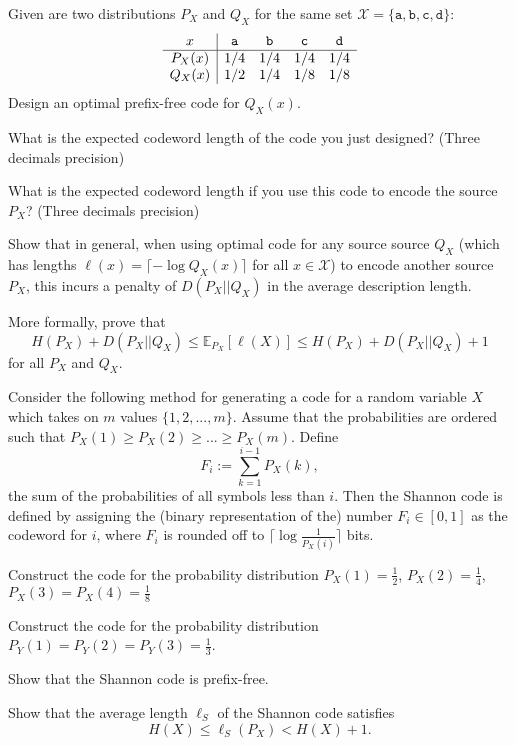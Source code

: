 \documentclass[a4paper,10pt,landscape,twocolumn]{scrartcl}
\begin{document}
\begin{exercise}
\begin{subex}[(2pt)]
Given are two distributions $P_X$ and $Q_X$ for the same set $\mathcal{X} = \{\mathtt{a,b,c,d}\}$:
\[
\begin{array}{c | c c c c}
x & \mathtt{a}&\mathtt{b}&\mathtt{c}&\mathtt{d}\\\hline
P_X(x) & 1/4&1/4&1/4&1/4\\
Q_X(x) & 1/2&1/4&1/8&1/8\\
\end{array}
\]
Design an optimal prefix-free code for $Q_X(x)$.
\end{subex}
\begin{subex}[(1pt)]
What is the expected codeword length of the code you just designed? (Three decimals precision)
\end{subex}
\begin{subex}[(1pt)]
What is the expected codeword length if you use this code to encode the source $P_X$? (Three decimals precision)
\end{subex}
\begin{subex}[(4pt)]
Show that in general, when using optimal code for any source source $Q_X$ (which has lengths $\ell(x) = \lceil -\log Q_X(x) \rceil$ for all $x \in \mathcal{X}$) to encode another source $P_X$, this incurs a penalty of $D(P_X||Q_X)$ in the average description length.

More formally, prove that
\[
H(P_X) + D(P_X||Q_X) \leq \mathbb{E}_{P_X}[\ell(X)] \leq H(P_X) + D(P_X||Q_X) + 1
\]
for all $P_X$ and $Q_X$.
\end{subex}
\end{exercise}




\begin{exercise}
Consider the following method for generating a code for a random variable $X$ which takes on $m$ values $\{1,2,...,m\}$. Assume that the probabilities are ordered such that $P_X(1) \geq P_X(2) \geq ... \geq P_X(m)$. Define
\[
F_i := \sum_{k=1}^{i-1} P_X(k),
\]
the sum of the probabilities of all symbols less than $i$. Then the Shannon code is defined by assigning the (binary representation of the) number $F_i \in [0,1]$ as the codeword for $i$, where $F_i$ is rounded off to $\lceil \log\frac{1}{P_X(i)}\rceil$ bits.
	\begin{subex}[(1pt)]
	Construct the code for the probability distribution $P_X(1) = \frac{1}{2}$, $P_X(2) = \frac{1}{4}$, $P_X(3) = P_X(4) = \frac{1}{8}$
	\end{subex}
	\begin{subex}[(1pt)]
	Construct the code for the probability distribution $P_Y(1) = P_Y(2) = P_Y(3) = \frac{1}{3}$.
	\end{subex}
	\begin{subex}[(2pt)]
	Show that the Shannon code is prefix-free.
	\end{subex}
	\begin{subex}[(2pt)]
	Show that the average length $\ell_S$ of the Shannon code satisfies
	\[
	H(X) \leq \ell_S(P_X) < H(X) + 1.
	\]
	\end{subex}
\end{exercise}
\end{document}
